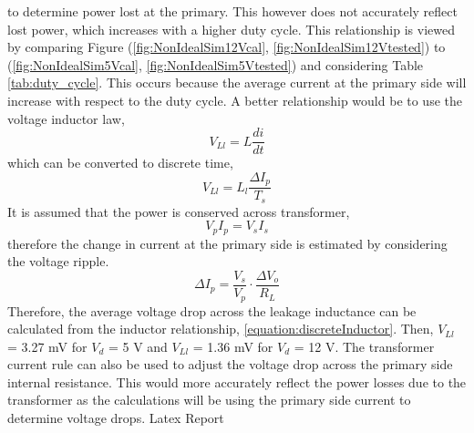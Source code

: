 \documentclass[12pt,twoside]{scrartcl}
\begin{document}
to determine power lost at the primary. This however does not accurately reflect lost power, which increases with a higher duty cycle. 
This relationship is viewed by comparing Figure (\ref{fig:NonIdealSim12Vcal}, \ref{fig:NonIdealSim12Vtested}) to (\ref{fig:NonIdealSim5Vcal}, \ref{fig:NonIdealSim5Vtested}) and considering Table \ref{tab:duty_cycle}.
This occurs because the average current at the primary side will increase with respect to the duty cycle. A better relationship would be to use the voltage inductor law,
\begin{equation}
    V_{Ll} = L \dfrac{di}{dt}
\end{equation} 
which can be converted to discrete time,
\begin{equation}
    V_{Ll} = L_l \dfrac{\Delta I_p}{T_s}
    \label{equation:discreteInductor}
\end{equation}
It is assumed that the power is conserved across transformer,
\begin{equation}
    V_pI_p = V_sI_s
\end{equation}
therefore the change in current at the primary side is estimated by considering the voltage ripple.
\begin{equation}
    \Delta I_p = \dfrac{V_s}{V_p} \cdot \dfrac{\Delta V_o}{R_L}
\end{equation} 
Therefore, the average voltage drop across the leakage inductance 
can be calculated from the inductor relationship, \ref{equation:discreteInductor}. Then, 
$V_{Ll}$ = 3.27 mV for $V_d$ = 5 V and $V_{Ll}$ = 1.36 mV for $V_d$ = 12 V. The transformer current rule
can also be used to adjust the voltage drop across the primary side internal resistance. This would more accurately 
reflect the power losses due to the transformer as the calculations will be using the primary side current to 
determine voltage drops. Latex Report


\newpage


\end{document}
